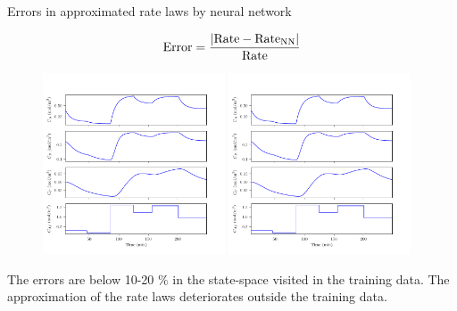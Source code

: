 \documentclass[xcolor=dvipsnames, 8pt]{beamer} %
\begin{document}
\begin{frame}{Errors in approximated rate laws by neural network}

	\begin{equation*}
	\textnormal{Error} = \dfrac{|\textnormal{Rate} - \textnormal{Rate}_{\textnormal{NN}}|}{\textnormal{Rate}}
	\end{equation*}
	\vspace{-0.1in}
		\begin{figure}
			\centering
		  \includegraphics[page=6, height=0.7\textheight, 
		  					width=0.48\textwidth]{tworeac_plots.pdf}
		  \includegraphics[page=7, height=0.7\textheight, 
		  				   width=0.48\textwidth]{tworeac_plots.pdf}
		\end{figure}
	The errors are \alert{below 10-20 $\%$} in the state-space visited
	in the training data. The approximation of the rate laws deteriorates
	outside the training data.
\end{frame}
\end{document}
